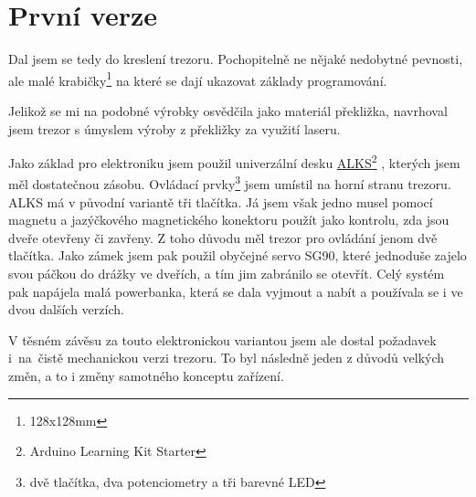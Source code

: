 \section{První verze}
\label{E1-vyvoj}

Dal jsem se tedy do kreslení trezoru. Pochopitelně ne nějaké nedobytné pevnosti, ale malé
krabičky\footnote{128x128mm} na které se dají ukazovat základy programování. 

Jelikož se mi na podobné výrobky osvědčila jako materiál překližka, navrhoval jsem trezor s úmyslem výroby z překližky za využití laseru. 

Jako základ pro elektroniku  jsem použil univerzální 
desku \href{https://github.com/RoboticsBrno/ArduinoLearningKitStarter}{ALKS}\footnote{Arduino Learning Kit Starter} \parencite{ALKS}, 
kterých jsem měl dostatečnou zásobu. Ovládací prvky\footnote{dvě tlačítka, dva potenciometry a tři barevné LED} jsem umístil na horní stranu trezoru. 
ALKS má v původní variantě tři tlačítka. Já jsem však jedno musel pomocí magnetu a jazýčkového magnetického konektoru použít
jako kontrolu, zda jsou dveře otevřeny či zavřeny. Z toho důvodu měl trezor pro ovládání jenom dvě tlačítka. 
Jako zámek jsem pak použil obyčejné servo SG90, které jednoduše zajelo svou páčkou do drážky ve dveřích, a tím jim zabránilo 
se otevřít. Celý systém pak napájela malá powerbanka, která se dala vyjmout a nabít  
a používala se i ve dvou dalších verzích.


V těsném závěsu za touto elektronickou variantou jsem ale dostal poža\-da\-vek i~na~čistě mechanickou verzi trezoru. 
To byl následně jeden z důvodů velkých změn, a to i změny samotného konceptu zařízení.